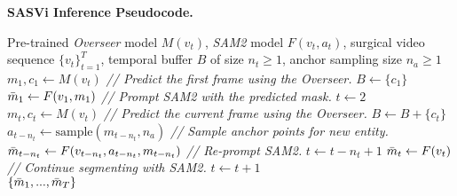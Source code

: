 \begin{algorithm}[htbp]
    \caption{\textbf{SASVi Inference Pseudocode.}}
    \label{alg:pseudocode}
    \begin{algorithmic}
        \Require Pre-trained \emph{Overseer} model $M(v_t)$, \emph{SAM2} model $F(v_t,a_t)$, surgical video sequence $\{v_t\}_{t=1}^T$, temporal buffer $B$ of size $n_t \geq 1$, anchor sampling size $n_a \geq 1$
        \State $m_1,c_1 \gets M(v_t)$ \textit{ // Predict the first frame using the Overseer.}
        \State $B \gets \{c_1\}$
        \State $\Bar{m}_1 \gets F(v_1,m_1)$ \textit{ // Prompt SAM2 with the predicted mask.}
        \State $t \gets 2$
        \State $m_t, c_t \gets M(v_{t})$ \textit{ // Predict the current frame using the Overseer.}
        \State $B \gets B + \{c_t\}$
            \State $a_{t-n_t} \gets \text{sample}(m_{t-n_t}, n_a)$ \textit{ // Sample anchor points for new entity.}
            \State $\Bar{m}_{t-n_t} \gets F(v_{t-n_t}, a_{t-n_t}, m_{t-n_t})$ \textit{ // Re-prompt SAM2.}
            \State $t \gets t-n_t+1$
        \Else
            \State $\Bar{m}_{t} \gets F(v_{t})$ \textit{ // Continue segmenting with SAM2.}
            \State $t \gets t+1$
        \EndIf
        \EndWhile    \\   
        \Return $\{\Bar{m}_1, ..., \Bar{m}_T\}$
    \end{algorithmic}
\end{algorithm}